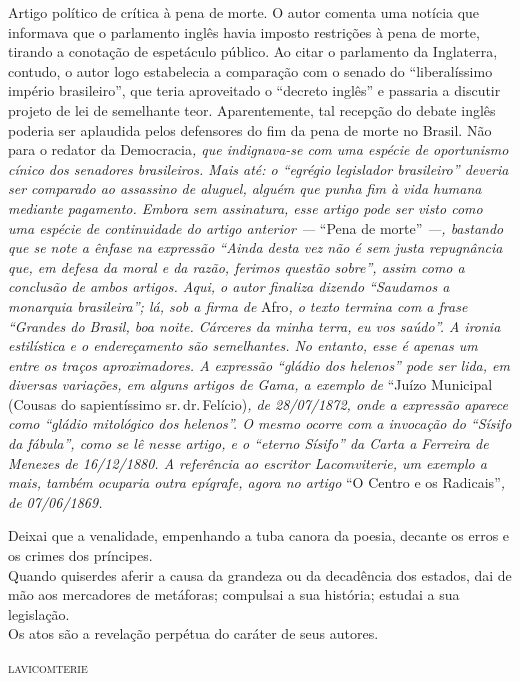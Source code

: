 \begin{didascalia}
Artigo político de crítica à pena de morte. O autor comenta uma notícia
que informava que o parlamento inglês havia imposto restrições à pena de
morte, tirando a conotação de espetáculo público. Ao citar o parlamento
da Inglaterra, contudo, o autor logo estabelecia a comparação com o
senado do ``liberalíssimo império brasileiro'', que teria aproveitado o
``decreto inglês'' e passaria a discutir projeto de lei de semelhante
teor. Aparentemente, tal recepção do debate inglês poderia ser aplaudida
pelos defensores do fim da pena de morte no Brasil. Não para o redator
da Democracia\emph{, que indignava-se com uma espécie de oportunismo
cínico dos senadores brasileiros. Mais até: o ``egrégio legislador
brasileiro'' deveria ser comparado ao assassino de aluguel, alguém que
punha fim à vida humana mediante pagamento. Embora sem assinatura, esse
artigo pode ser visto como uma espécie de continuidade do artigo
anterior ---} ``Pena de morte'' \emph{---, bastando que se note a ênfase na
expressão ``Ainda desta vez não é sem justa repugnância que, em defesa da
moral e da razão, ferimos questão sobre'', assim como a conclusão de
ambos artigos. Aqui, o autor finaliza dizendo ``Saudamos a monarquia
brasileira''; lá, sob a firma de} Afro\emph{, o texto termina com a frase
``Grandes do Brasil, boa noite. Cárceres da minha terra, eu vos saúdo''. A
ironia estilística e o endereçamento são semelhantes. No entanto, esse é
apenas um entre os traços aproximadores. A expressão ``gládio dos
helenos'' pode ser lida, em diversas variações, em alguns artigos de
Gama, a exemplo de} ``Juízo Municipal (Cousas do sapientíssimo sr.\,dr.\,Felício)\emph{, de 28/07/1872, onde a expressão aparece como ``gládio
mitológico dos helenos''. O mesmo ocorre com a invocação do ``Sísifo da
fábula'', como se lê nesse artigo, e o ``eterno Sísifo'' da Carta a
Ferreira de Menezes de 16/12/1880. A referência ao escritor
Lacomviterie, um exemplo a mais, também ocuparia outra epígrafe, agora
no artigo} ``O Centro e os Radicais''\emph{, de 07/06/1869.}
\end{didascalia}



\epigraph{Deixai que a venalidade, empenhando a tuba\footnotemark{} canora\footnotemark{} da
poesia, decante os erros e os crimes dos príncipes.\\
Quando quiserdes aferir a causa da grandeza ou da decadência dos
estados, dai de mão aos mercadores de metáforas; compulsai\footnotemark{} a sua história; estudai a sua legislação.\\
Os atos são a revelação perpétua do caráter de seus autores.}{\textsc{lavicomterie}\footnotemark}


